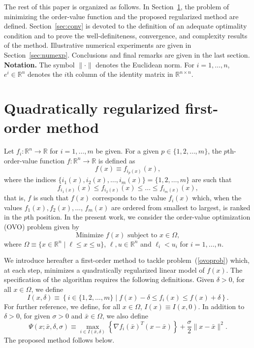\documentclass[11pt]{article}
\newcommand{\R}{\mathbb{R}}
\begin{document}
The rest of this paper is organized as follows. In Section~\ref{sec:method}, the problem of minimizing the order-value function and the proposed regularized method are defined. Section~\ref{sec:conv} is devoted to the definition of an adequate optimality condition and to prove the well-definiteness, convergence, and complexity results of the method. Illustrative numerical experiments are given in Section~\ref{sec:numexp}. Conclusions and final remarks are given in the last section.\\

\noindent
\textbf{Notation.} The symbol $\| \cdot \|$ denotes the Euclidean norm. For $i=1,\dots,n$, $e^i \in \R^n$ denotes the $i$th column of the identity matrix in $\R^{n \times n}$.

\section{Quadratically regularized first-order method} \label{sec:method}

Let $f_i : \R^n \to \R$ for $i=1,\dots,m$ be given. For a given $p \in \{1, 2, \dots, m\}$, the $p$th-order-value function $f : \R^n \to \R$ is defined as
\begin{equation} \label{funcion_ovo}
f(x) \equiv f_{i_p(x)}(x),
\end{equation}
where the indices $\{ i_1(x), i_2(x), \dots, i_m(x)\} = \{ 1, 2, \dots, m \}$ are such that
\begin{equation} \label{ordenacion}
f_{i_1(x)}(x) \leq f_{i_2(x)}(x) \leq \dots \leq f_{i_m(x)}(x),
\end{equation}
that is, $f$ is such that $f(x)$ corresponds to the value $f_i(x)$ which, when the values $f_1(x), f_2(x), \dots$, $f_m(x)$ are ordered from smallest to largest, is ranked in the $p$th position. In the present work, we consider the order-value optimization (OVO) problem given by
\begin{equation} \label{ovoprob}
\mbox{Minimize } f(x) \mbox{ subject to } x \in \Omega,
\end{equation}
where $\Omega \equiv \{ x \in \R^n \;|\; \ell \leq x \leq u \}$, $\ell, u \in \R^n$ and $\ell_i < u_i$ for $i=1,\dots,n$.

We introduce hereafter a first-order method to tackle problem~(\ref{ovoprob}) which, at each step, minimizes a quadratically regularized linear model of $f(x)$. The specification of the algorithm requires the following definitions. Given $\delta > 0$, for all $x \in \Omega$, we define
\begin{equation} \label{Idelta}
I(x,\delta) \equiv \left\{ i \in \{1,2,\dots,m\} \;|\; f(x) - \delta \leq f_i(x) \leq f(x) + \delta \right\}.
\end{equation}
For further reference, we define, for all $x \in \Omega$, $I(x) \equiv I(x,0)$. In addition to $\delta > 0$, for given $\sigma>0$ and $\bar x \in \Omega$, we also define
\begin{equation} \label{psidef}
\Psi(x;\bar x,\delta,\sigma) \equiv \max_{i \in I(\bar x,\delta)} \left\{\nabla f_i(\bar x)^T (x - \bar x) \right\} + \dfrac{\sigma}{2} \|x - \bar x\|^2.
\end{equation}
The proposed method follows below.\\
\end{document}
